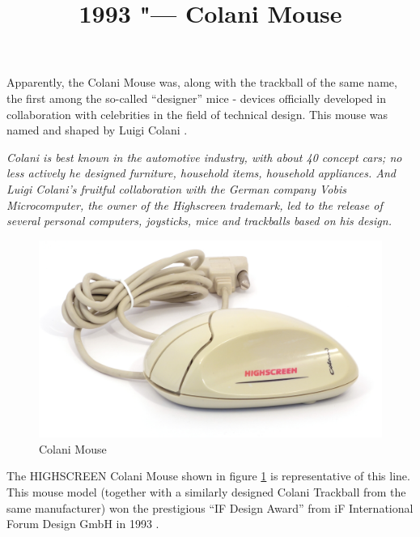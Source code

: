 \documentclass[11pt, a4paper]{article}
\begin{document}
\title{1993 "--- Colani Mouse}
\date{}
\maketitle
{}
Apparently, the Colani Mouse was, along with the trackball of the same name, the first among the so-called “designer” mice - devices officially developed in collaboration with celebrities in the field of technical design. This mouse was named and shaped by Luigi Colani \cite{wiki}.

\textit{Colani is best known in the automotive industry, with about 40 concept cars; no less actively he designed furniture, household items, household appliances. And Luigi Colani's fruitful collaboration with the German company Vobis Microcomputer, the owner of the Highscreen trademark, led to the release of several personal computers, joysticks, mice and trackballs based on his design.}

\begin{figure}[h]
    \centering
    \includegraphics[scale=0.6]{1993_colani_mouse/pic_60.jpg}
    \caption{Colani Mouse}
    \label{fig:ColaniMousePic}
\end{figure}

The HIGHSCREEN Colani Mouse shown in figure \ref{fig:ColaniMousePic} is representative of this line. This mouse model (together with a similarly designed Colani Trackball from the same manufacturer) won the prestigious “IF Design Award” from iF International Forum Design GmbH in 1993 \cite{award}.
\end{document}
